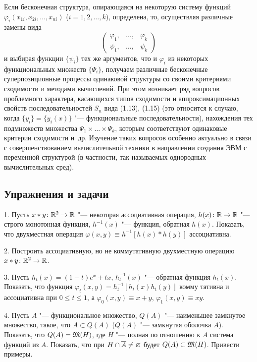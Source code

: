 Если бесконечная структура, опирающаяся на некоторую систему функций
$\varphi_i(x_{1i},x_{2i},\dots,x_{ni})$ ($i=1,2,\dots,k$), определена, то,
осуществляя различные замены вида
\[
\begin{pmatrix}\varphi_1,&\dots,&\varphi_k\\ \psi_1,&\dots,&\psi_k\end{pmatrix}
\]
и выбирая функции $\{\psi_i\}$ тех же аргументов, что и $\varphi_i$ из
некоторых функциональных множеств $\{\Psi_i\}$, получаем различные
бесконечные суперпозиционные процессы одинаковой структуры со своими
критериями сходимости и методами вычислений. При этом возникает ряд
вопросов проблемного характера, касающихся типов сходимости
и аппроксимационных свойств последовательностей $S_n$ вида (1.13), (1.15)
(это относится к случаю, когда $\{y_i\}=\{y_i(x)\}$ "--- функциональные
последовательности), нахождения тех подмножеств множества
$\Psi_1\times\dots\times\Psi_k$, которым соответствуют одинаковые критерии
сходимости и~др. Изучение таких вопросов особенно актуально в связи
с совершенствованием вычислительной техники в направлении создания ЭВМ
с переменной структурой (в частности, так называемых однородных
вычислительных сред).

\subsection*{Упражнения и задачи}
1. Пусть $x*y\colon\mathbb R^2\to\mathbb R$ "--- некоторая ассоциативная операция,
$h(x)\colon\mathbb R\to\mathbb R$ "--- строго монотонная функция, $h^{-1}(x)$ "---
функция, обратная $h(x)$. Показать, что двухместная операция
$\varphi(x,y)\equiv h^{-1}[h(x)*h(y)]$ ассоциативна.

2. Построить ассоциативную, но не коммутативную двухместную операцию
$x*y\colon\mathbb R^2\to\mathbb R$.

3. Пусть $h_t(x)=(1-t)e^x+tx$, $h_t^{-1}(x)$ "--- обратная функция
$h_t(x)$. Показать, что функция $\varphi_t(x,y)=h_t^{-1}[h_t(x)h_t(y)]$
комму\-%
%
тативна и ассоциативна при $0\le t\le1$, а $\varphi_0(x,y)\equiv x+y$,
$\varphi_1(x,y)\equiv xy$.

4. Пусть $A$ "--- функциональное множество, $Q(A)$ "--- наименьшее
замкнутое множество, такое, что $A\subset Q(A)$ ($Q(A)$ "--- замкнутая
оболочка $A$). Показать, что $Q(A)=\mathfrak M(H)$, где $H$ "--- полная по
отношению к $A$ система функций из $A$. Показать, что при
$H\cap\overline{A}\ne\varnothing$ будет $Q(A)\subset\mathfrak M(H)$. Привести примеры.

